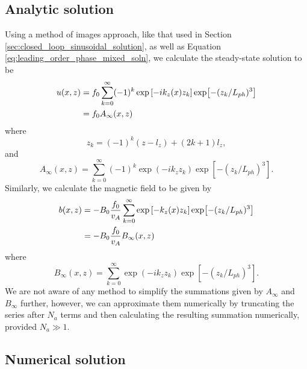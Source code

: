 \subsection{Analytic solution}

Using a method of images approach, like that used in Section \ref{sec:closed_loop_sinusoidal_solution}, as well as Equation \eqref{eq:leading_order_phase_mixed_soln}, we calculate the steady-state solution to be
\begin{equation}
    \label{eq:chap_3_closed_loop_phase_mix_soln_u}
    \begin{aligned}
    u(x,z) &= f_0\sum_{k=0}^\infty (-1)^k\exp\qty[-ik_z(x)z_k]\exp[-(z_k / L_{ph})^3] \\
    &= f_0A_\infty(x,z)
    \end{aligned}
\end{equation}
where
\begin{equation}
    z_k = (-1)^k (z-l_z) + (2k+1)l_z,
\end{equation}
and
\begin{equation}
    A_\infty(x,z) = \sum_{k=0}^\infty (-1)^k \exp(-ik_z z_k)\exp[-(z_k / L_{ph})^3].
\end{equation}
Similarly, we calculate the magnetic field to be given by
\begin{equation}
    \label{eq:chap_3_closed_loop_phase_mix_soln_b}
    \begin{aligned}
    b(x,z) &= -B_0\frac{f_0}{v_A}\sum_{k=0}^\infty \exp\qty[-k_z(x)z_k]\exp[-(z_k / L_{ph})^3] \\
    &= -B_0\frac{f_0}{v_A}B_\infty(x,z)
    \end{aligned}
\end{equation}
where
\begin{equation}
    B_\infty(x,z) = \sum_{k=0}^\infty \exp(-ik_z z_k)\exp[-(z_k / L_{ph})^3].
\end{equation}
We are not aware of any method to simplify the summations given by $A_\infty$ and $B_\infty$ further, however, we can approximate them numerically by truncating the series after $N_a$ terms and then calculating the resulting summation numerically, provided $N_a\gg 1$.

\subsection{Numerical solution}

